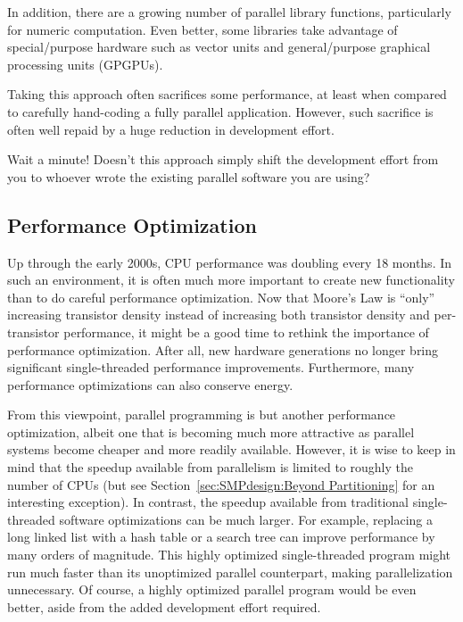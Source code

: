 In addition, there are a growing number of parallel library functions,
particularly for numeric computation.
Even better, some libraries take advantage of special\-/purpose
hardware such as vector units and general\-/purpose graphical processing
units (GPGPUs).

Taking this approach often sacrifices some performance, at least when
compared to carefully hand-coding a fully parallel application.
However, such sacrifice is often well repaid by a huge reduction in
development effort.

\QuickQuiz{}
	Wait a minute!
	Doesn't this approach simply shift the development effort from
	you to whoever wrote the existing parallel software you are using?
 \QuickQuizEnd

\subsection{Performance Optimization}
\label{sec:intro:Performance Optimization}

Up through the early 2000s, CPU performance was doubling every 18 months.
In such an environment, it is often much more important to create new
functionality than to do careful performance optimization.
Now that Moore's Law is ``only'' increasing transistor density instead
of increasing both transistor density and per-transistor performance,
it might be a good time to rethink the importance of performance
optimization.
After all, new hardware generations no longer bring significant
single-threaded performance improvements.
Furthermore, many performance optimizations can also conserve energy.

From this viewpoint, parallel programming is but another performance
optimization, albeit one that is becoming much more attractive
as parallel systems become cheaper and more readily available.
However, it is wise to keep in mind that the speedup available from
parallelism is limited to roughly the number of CPUs
(but see Section~\ref{sec:SMPdesign:Beyond Partitioning}
for an interesting exception).
In contrast, the speedup available from traditional single-threaded
software optimizations can be much larger.
For example, replacing a long linked list with a hash table
or a search tree can improve performance by many orders of magnitude.
This highly optimized single-threaded program might run much
faster than its unoptimized parallel counterpart, making parallelization
unnecessary.
Of course, a highly optimized parallel program would be even better,
aside from the added development effort required.

